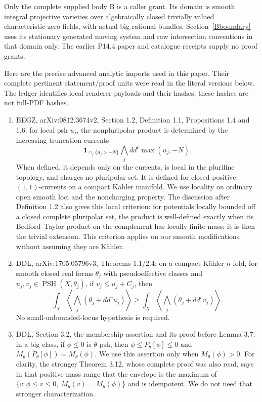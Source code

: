 \documentclass[11pt]{article}
\theoremstyle{remark}\newtheorem{remark}[theorem]{Remark}
\newcommand{\ddc}{dd^c}
\newcommand{\PSH}{\operatorname{PSH}}
\begin{document}
Only the complete supplied body B is a caller grant. Its domain is
smooth integral projective varieties over algebraically closed
trivially valued characteristic-zero fields, with actual big rational
bundles. Section~\ref{Bboundary} uses its stationary generated moving
system and raw intersection conventions in that domain only.
The earlier P14.4 paper and catalogue receipts supply no proof grants.

Here are the precise advanced analytic imports used in this paper.
Their complete pertinent statement/proof units were read in the literal
versions below. The ledger identifies local renderer payloads and
their hashes; these hashes are not full-PDF hashes.
\begin{enumerate}
\item BEGZ, arXiv:0812.3674v2, Section 1.2, Definition 1.1,
Propositions 1.4 and 1.6: for local psh $u_j$, the nonpluripolar
product is determined by the increasing truncation currents
\[
 \mathbf1_{\cap_j\{u_j>-N\}}\bigwedge_j
 \ddc\max(u_j,-N).
\]
When defined, it depends only on the currents, is local in the
plurifine topology, and charges no pluripolar set.
It is defined for closed positive $(1,1)$-currents on a compact
K\"ahler manifold. We use locality on ordinary open smooth loci
and the noncharging property. The discussion after Definition 1.2
also gives this local criterion: for potentials locally bounded off
a closed complete pluripolar set, the product is well-defined exactly
when its Bedford--Taylor product on the complement has locally finite
mass; it is then the trivial extension. This criterion applies on our
smooth modifications without assuming they are K\"ahler.
\item DDL, arXiv:1705.05796v3, Theorems 1.1/2.4:
on a compact K\"ahler $n$-fold, for smooth closed real forms
$\theta_j$ with pseudoeffective classes and
$u_j,v_j\in\PSH(X,\theta_j)$, if $v_j\leq u_j+C_j$, then
\[
 \int_X\left\langle\bigwedge_j(\theta_j+\ddc u_j)\right\rangle
 \geq
 \int_X\left\langle\bigwedge_j(\theta_j+\ddc v_j)\right\rangle.
 \tag{1.2}
\]
No small-unbounded-locus hypothesis is required.
\item DDL, Section 3.2, the membership assertion and its proof before
Lemma 3.7: in a big class, if $\phi\leq0$ is $\theta$-psh, then
$\phi\leq P_\theta[\phi]\leq0$ and
$M_\theta(P_\theta[\phi])=M_\theta(\phi)$.
We use this assertion only when $M_\theta(\phi)>0$.
For clarity, the stronger Theorem 3.12, whose complete proof was also
read, says in that positive-mass range that the envelope is the
maximum of
$\{v:\phi\leq v\leq0,\ M_\theta(v)=M_\theta(\phi)\}$ and is idempotent.
We do not need that stronger characterization.
\end{enumerate}
\end{document}
